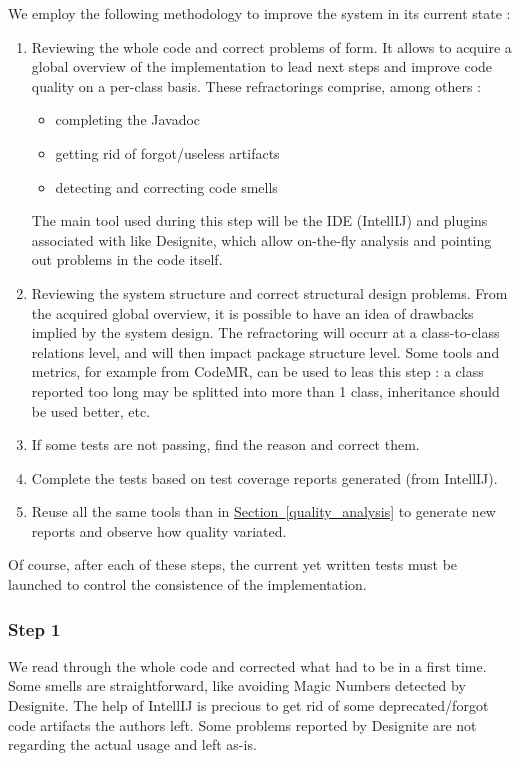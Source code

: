 \documentclass[]{article}
\newcommand{\wordlink}[2]{\hyperref[#2]{#1~\ref{#2}}}
\begin{document}
We employ the following methodology to improve the system in its current state :
\begin{enumerate}
\item Reviewing the whole code and correct problems of form. It allows to acquire a global overview of the implementation to lead next steps and improve code quality on a per-class basis. These refractorings comprise, among others :
\begin{itemize}
\item completing the Javadoc
\item getting rid of forgot/useless artifacts
\item detecting and correcting code smells
\end{itemize}
The main tool used during this step will be the IDE (IntellIJ) and plugins associated with like Designite, which allow on-the-fly analysis and pointing out problems in the code itself.


\item Reviewing the system structure and correct structural design problems. From the acquired global overview, it is possible to have an idea of drawbacks implied by the system design. The refractoring will occurr at a class-to-class relations level, and will then impact package structure level. Some tools and metrics, for example from CodeMR, can be used to leas this step : a class reported too long may be splitted into more than 1 class, inheritance should be used better, etc.

\item If some tests are not passing, find the reason and correct them.

\item Complete the tests based on test coverage reports generated (from IntellIJ).

\item Reuse all the same tools than in \wordlink{Section}{quality_analysis} to generate new reports and observe how quality variated.
 
\end{enumerate}
\vspace{0.2cm}
Of course, after each of these steps, the current yet written tests must be launched to control the consistence of the implementation.

\subsubsection{Step 1}

We read through the whole code and corrected what had to be in a first time. Some smells are straightforward, like avoiding Magic Numbers detected by Designite. The help of IntellIJ is precious to get rid of some deprecated/forgot code artifacts the authors left. Some problems reported by Designite are not regarding the actual usage and left as-is.
\end{document}
